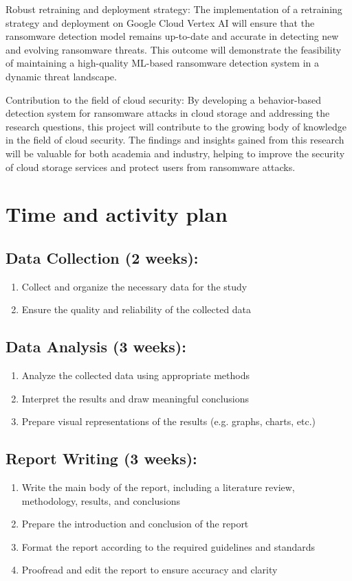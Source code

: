 \documentclass[12pt,a4paper,twoside]{article}
\begin{document}
Robust retraining and deployment strategy: The implementation of a retraining strategy and deployment on Google Cloud Vertex AI will ensure that the ransomware detection model remains up-to-date and accurate in detecting new and evolving ransomware threats. This outcome will demonstrate the feasibility of maintaining a high-quality ML-based ransomware detection system in a dynamic threat landscape.

Contribution to the field of cloud security: By developing a behavior-based detection system for ransomware attacks in cloud storage and addressing the research questions, this project will contribute to the growing body of knowledge in the field of cloud security. The findings and insights gained from this research will be valuable for both academia and industry, helping to improve the security of cloud storage services and protect users from ransomware attacks.

\section{Time and activity plan}
\label{sec:plan}


\subsection{Data Collection (2 weeks):}
\begin{enumerate}
\item {Collect and organize the necessary data for the study}
\item {Ensure the quality and reliability of the collected data}
\end{enumerate}

\subsection {Data Analysis (3 weeks):}
\begin{enumerate}
\item {Analyze the collected data using appropriate methods}
\item {Interpret the results and draw meaningful conclusions}
\item {Prepare visual representations of the results (e.g. graphs, charts, etc.)}
\end{enumerate}

\subsection {Report Writing (3 weeks):}
\begin{enumerate}
\item {Write the main body of the report, including a literature review, methodology, results, and conclusions}
\item {Prepare the introduction and conclusion of the report}
\item {Format the report according to the required guidelines and standards}
\item {Proofread and edit the report to ensure accuracy and clarity}
\end{enumerate}
\end{document}
